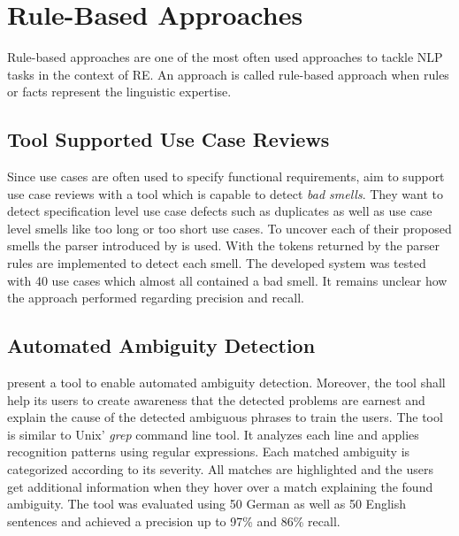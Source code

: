 \section{Rule-Based Approaches}
\label{chp:related_research:sec:rule_based approaches}
Rule-based approaches are one of the most often used approaches to tackle \ac{NLP} tasks in the context of \ac{RE}.
An approach is called rule-based approach when rules or facts represent the linguistic expertise. \parencite{Zhao:2020}

\subsection{Tool Supported Use Case Reviews}
Since use cases are often used to specify functional requirements, \textcite{Ciemniewska:2007} aim to support use case reviews with a tool which is capable to detect \textit{bad smells}.
They want to detect specification level use case defects such as duplicates as well as use case level smells like too long or too short use cases.
To uncover each of their proposed smells the parser introduced by \textcite{Klein:2002} is used.
With the tokens returned by the parser rules are implemented to detect each smell.
The developed system was tested with 40 use cases which almost all contained a bad smell.
It remains unclear how the approach performed regarding precision and recall.

\subsection{Automated Ambiguity Detection}
\textcite{Gleich:2010} present a tool to enable automated ambiguity detection.
Moreover, the tool shall help its users to create awareness that the detected problems are earnest and explain the cause of the detected ambiguous phrases to train the users.
The tool is similar to Unix' \textit{grep} command line tool.
It analyzes each line and applies recognition patterns using regular expressions.
Each matched ambiguity is categorized according to its severity.
All matches are highlighted and the users get additional information when they hover over a match explaining the found ambiguity.
The tool was evaluated using 50 German as well as 50 English sentences and achieved a precision up to 97\% and 86\% recall.

